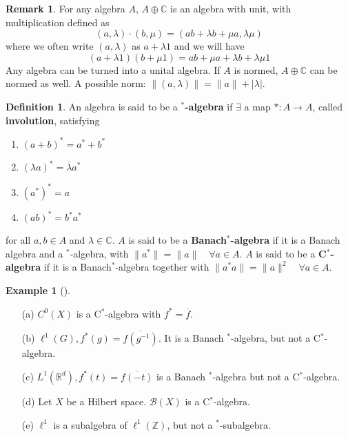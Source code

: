 \documentclass{article}
\theoremstyle{definition}
\newtheorem{ex}{Example}
\newtheorem{dfn}{Definition}
\newtheorem{rem}{Remark}
\newenvironment{exs}[1][]{%
  \begin{ex}[#1]$ $\par\nobreak\ignorespaces
}{%
  \end{ex}
}
\newcommand{\B}{\mathcal B}
\newcommand{\CC}{\mathbb C}
\newcommand{\RR}{\mathbb R}
\newcommand{\ZZ}{\mathbb Z}
\begin{document}
\begin{rem}
	For any algebra $A$, $A \oplus \CC$ is an algebra with unit, with multiplication defined as
	\[
		(a, \lambda) \cdot (b, \mu) = (ab + \lambda b + \mu a, \lambda \mu)
	\]
	where we often write $(a, \lambda)$ as $a + \lambda 1$ and we will have
	\[
		(a + \lambda 1)(b + \mu 1) = ab + \mu a + \lambda b + \lambda \mu 1
	\]
	Any algebra can be turned into a unital algebra.
	If $A$ is normed, $A \oplus \CC$ can be normed as well.
	A possible norm: $\|(a, \lambda)\| = \|a\| + |\lambda|$.
\end{rem}

\begin{dfn}
	An algebra is said to be a $\bm{^*}$\textbf{-algebra} if $\exists$ a map $*: A \to A$, called \textbf{involution}, satisfying
	\begin{enumerate}
		\item $(a + b)^* = a^* + b^*$

		\item $(\lambda a)^* = \overline{\lambda} a^*$

		\item $(a^*)^* = a$

		\item $(ab)^* = b^* a^*$
	\end{enumerate}
	for all $a, b \in A$ and $\lambda \in \CC$.
	$A$ is said to be a \textbf{Banach$\bm{^*}$-algebra} if it is a Banach algebra and a $^*$-algebra, with $\|a^*\| = \|a\| \quad \forall a \in A$.
	$A$ is said to be a \textbf{C$\bm{^*}$-algebra} if it is a Banach$^*$-algebra together with $\|a^* a\| = \|a\|^2 \quad \forall a \in A$.
\end{dfn}

\begin{exs}
	\begin{enumerate}
		\item[(a)] $C^0(X)$ is a C$^*$-algebra with $f^* = \overline{f}$.

		\item[(b)] $\ell^1(G), f^*(g) = \overline{f(g^{-1})}$.
			It is a Banach $^*$-algebra, but not a C$^*$-algebra.

		\item[(c)] $L^1(\RR^d), f^*(t) = \overline{f(-t)}$ is a Banach $^*$-algebra but not a C$^*$-algebra.

		\item[(d)] Let $X$ be a Hilbert space.
			$\B(X)$ is a C$^*$-algebra.

		\item[(e)] $\ell^1$ is a subalgebra of $\ell^1(\ZZ)$, but not a $^*$-subalgebra.
	\end{enumerate}
\end{exs}	
\end{document}
